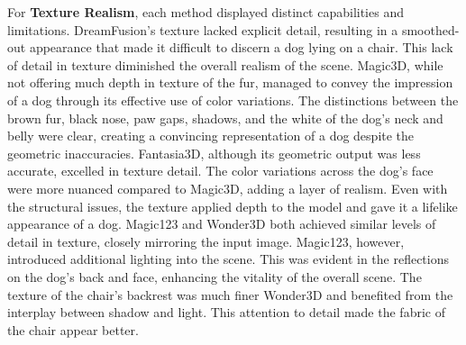 For \textbf{Texture Realism}, each method displayed distinct capabilities and limitations. DreamFusion's texture lacked explicit detail, resulting in a smoothed-out appearance that made it difficult to discern a dog lying on a chair. This lack of detail in texture diminished the overall realism of the scene. Magic3D, while not offering much depth in texture of the fur, managed to convey the impression of a dog through its effective use of color variations. The distinctions between the brown fur, black nose, paw gaps, shadows, and the white of the dog's neck and belly were clear, creating a convincing representation of a dog despite the geometric inaccuracies. Fantasia3D, although its geometric output was less accurate, excelled in texture detail. The color variations across the dog's face were more nuanced compared to Magic3D, adding a layer of realism. Even with the structural issues, the texture applied depth to the model and gave it a lifelike appearance of a dog. Magic123 and Wonder3D both achieved similar levels of detail in texture, closely mirroring the input image. Magic123, however, introduced additional lighting into the scene. This was evident in the reflections on the dog's back and face, enhancing the vitality of the overall scene. The texture of the chair's backrest was much finer Wonder3D and benefited from the interplay between shadow and light. This attention to detail made the fabric of the chair appear better.

